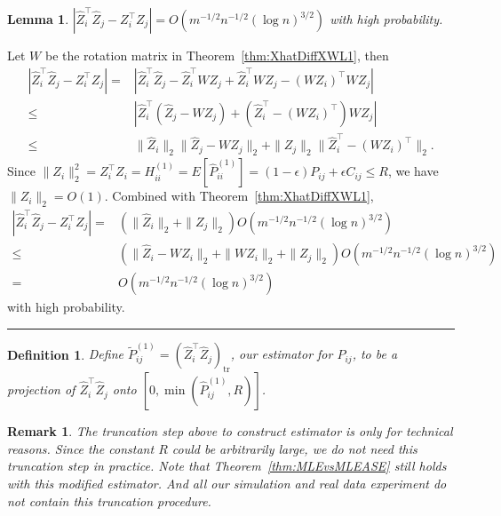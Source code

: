 \documentclass[a4paper]{article}
\newenvironment{proof}{{\bf Proof:  }}{\hfill\rule{2mm}{2mm}}
\newtheorem{lemma}[fact]{Lemma}
\newtheorem{definition}[fact]{Definition}
\newtheorem{remark}[fact]{Remark}
\renewcommand{\hat}{\widehat}
\begin{document}
\begin{lemma}
\label{lemma:1stMomentPhatDiffL1}
$\left|  \hat{Z}_i^{\top} \hat{Z}_j - Z_i^{\top} Z_j \right| = O(m^{-1/2} n^{-1/2} (\log n)^{3/2})$ with high probability.
\end{lemma}
\begin{proof}
Let $W$ be the rotation matrix in Theorem~\ref{thm:XhatDiffXWL1}, then
\begin{align*}
	\left|  \hat{Z}_i^{\top} \hat{Z}_j - Z_i^{\top} Z_j \right|
    = & \left| \hat{Z}_i^{\top} \hat{Z}_j - \hat{Z}_i^{\top} W Z_j + \hat{Z}_i^{\top} W Z_j - (W Z_i)^{\top} W Z_j \right| \\
    \le & \left| \hat{Z}_i^{\top} (\hat{Z}_j - W Z_j) + (\hat{Z}_i^{\top} - (W Z_i)^{\top}) W Z_j \right| \\
    \le & \|\hat{Z}_i\|_2 \|\hat{Z}_j - W Z_j\|_2 + \|Z_j\|_2 \|\hat{Z}_i^{\top} - (W Z_i)^{\top}\|_2.
\end{align*}
Since $\|Z_i\|_2^2 = Z_i^{\top} Z_i = H^{(1)}_{ii} =  E[\hat{P}^{(1)}_{ii}] = (1-\epsilon) P_{ij} + \epsilon C_{ij} \le R$, we have $\|Z_i\|_2 = O(1)$.
Combined with Theorem~\ref{thm:XhatDiffXWL1},
\begin{align*}
    \left|  \hat{Z}_i^{\top} \hat{Z}_j - Z_i^{\top} Z_j \right|
    = & (\|\hat{Z}_i\|_2 + \|Z_j\|_2) O(m^{-1/2} n^{-1/2} (\log n)^{3/2}) \\
    \le & (\|\hat{Z}_i - W Z_i\|_2 + \|W Z_i\|_2 + \|Z_j\|_2) O(m^{-1/2} n^{-1/2} (\log n)^{3/2}) \\
    = & O(m^{-1/2} n^{-1/2} (\log n)^{3/2})
\end{align*}
with high probability.
\end{proof}

\begin{definition}
\label{def:truncationMLE}
Define $\widetilde{P}_{ij}^{(1)} = (\hat{Z}_i^{\top} \hat{Z}_j)_{\mathrm{tr}}$, our estimator for $P_{ij}$, to be a projection of $\hat{Z}_i^{\top} \hat{Z}_j$ onto $[0, \min(\hat{P}_{ij}^{(1)}, R)]$.
\end{definition}

\begin{remark}
\label{remark:truncation}
The truncation step above to construct estimator is only for technical reasons. Since the constant $R$ could be arbitrarily large, we do not need this truncation step in practice. Note that Theorem~\ref{thm:MLEvsMLEASE} still holds with this modified estimator. And all our simulation and real data experiment do not contain this truncation procedure.
\end{remark}
\end{document}
